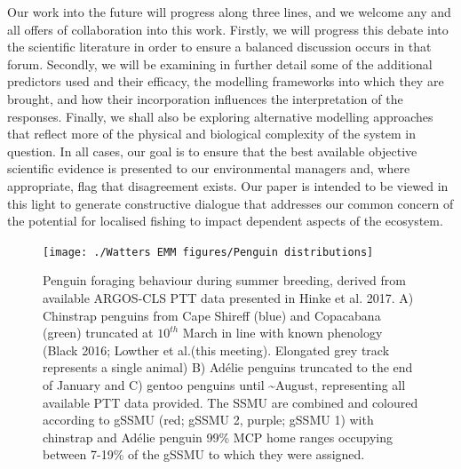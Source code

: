 \documentclass[]{elsarticle} %
\begin{document}
Our work into the future will progress along three lines, and we welcome
any and all offers of collaboration into this work. Firstly, we will
progress this debate into the scientific literature in order to ensure a
balanced discussion occurs in that forum. Secondly, we will be examining
in further detail some of the additional predictors used and their
efficacy, the modelling frameworks into which they are brought, and how
their incorporation influences the interpretation of the responses.
Finally, we shall also be exploring alternative modelling approaches
that reflect more of the physical and biological complexity of the
system in question. In all cases, our goal is to ensure that the best
available objective scientific evidence is presented to our
environmental managers and, where appropriate, flag that disagreement
exists. Our paper is intended to be viewed in this light to generate
constructive dialogue that addresses our common concern of the potential
for localised fishing to impact dependent aspects of the ecosystem.
\newpage  

\begin{figure}
\texttt{[image: ./Watters EMM figures/Penguin distributions]} \caption{Penguin foraging behaviour during summer breeding, derived from available ARGOS-CLS PTT data presented in Hinke et al. 2017. A) Chinstrap penguins from Cape Shireff (blue) and Copacabana (green) truncated at $10^{th}$ March in line with known phenology (Black 2016; Lowther et al.(this meeting).  Elongated grey track represents a single animal) B) Adélie penguins truncated to the end of January and C) gentoo penguins until \textasciitilde{}August, representing all available PTT data provided. The SSMU are combined and coloured according to gSSMU (red; gSSMU 2, purple; gSSMU 1) with chinstrap and Adélie penguin 99\% MCP home ranges occupying between 7-19\% of the gSSMU to which they were assigned.}\label{fig:Penguin distribution plots}
\end{figure}
\end{document}
